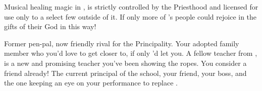 \documentclass[char]{GL2020}
\begin{document}
\begin{itemz}[Notes]
	\item Musical healing magic in \pFarm{}, is strictly controlled by the Priesthood and licensed for use only to a select few outside of it. If only more of \cFarmGod{}’s people could rejoice in the gifts of their God in this way!
\end{itemz}

\begin{contacts}
	\contact{\cBeetle{}} Former pen-pal, now friendly rival for the Principality.
	\contact{\cAdopted{}} Your adopted family member who you’d love to get closer to, if only \cAdopted{\they}’d let you.
	\contact{\cInterpol{}} A fellow teacher from \pFarm{}, \cInterpol{} is a new and promising teacher you’ve been showing the ropes.  You consider \cInterpol{\them} a friend already!
\contact{\cPrincipal{}} The current principal of the school, your friend, your boss, and the one keeping an eye on your performance to replace \cPrincipal{\them}.
\end{contacts}
\end{document}
